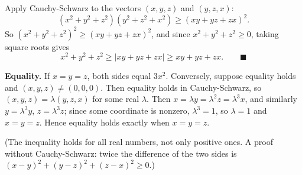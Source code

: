 Apply Cauchy-Schwarz to the vectors $(x,y,z)$ and $(y,z,x)$:
\[\left(x^2+y^2+z^2\right)\left(y^2+z^2+x^2\right)\ge(xy+yz+zx)^2 .\]
So $\left(x^2+y^2+z^2\right)^2\ge(xy+yz+zx)^2$, and since $x^2+y^2+z^2\ge0$, taking square roots gives
\[x^2+y^2+z^2\ge|xy+yz+zx|\ge xy+yz+zx. \qquad\blacksquare\]

\textbf{Equality.} If $x=y=z$, both sides equal $3x^2$. Conversely, suppose equality holds and $(x,y,z)\ne(0,0,0)$. Then equality holds in Cauchy-Schwarz, so $(x,y,z)=\lambda(y,z,x)$ for some real $\lambda$. Then $x=\lambda y=\lambda^2z=\lambda^3x$, and similarly $y=\lambda^3y$, $z=\lambda^3z$; since some coordinate is nonzero, $\lambda^3=1$, so $\lambda=1$ and $x=y=z$. Hence equality holds exactly when $\boxed{x=y=z}$.

(The inequality holds for all real numbers, not only positive ones. A proof without Cauchy-Schwarz: twice the difference of the two sides is $(x-y)^2+(y-z)^2+(z-x)^2\ge0$.)
